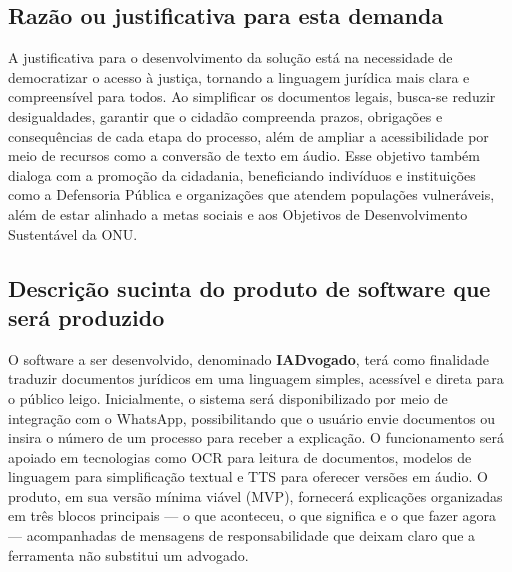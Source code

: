 \documentclass{article}
\begin{document}
    \subsection{Razão ou justificativa para esta demanda}
    A justificativa para o desenvolvimento da solução está na necessidade de democratizar o acesso à justiça, tornando a linguagem jurídica mais clara e compreensível para todos. Ao simplificar os documentos legais, busca-se reduzir desigualdades, garantir que o cidadão compreenda prazos, obrigações e consequências de cada etapa do processo, além de ampliar a acessibilidade por meio de recursos como a conversão de texto em áudio. Esse objetivo também dialoga com a promoção da cidadania, beneficiando indivíduos e instituições como a Defensoria Pública e organizações que atendem populações vulneráveis, além de estar alinhado a metas sociais e aos Objetivos de Desenvolvimento Sustentável da ONU.

\subsection{Descrição sucinta do produto de software que será produzido }
O software a ser desenvolvido, denominado \textbf{IADvogado}, terá como finalidade traduzir documentos jurídicos em uma linguagem simples, acessível e direta para o público leigo. Inicialmente, o sistema será disponibilizado por meio de integração com o WhatsApp, possibilitando que o usuário envie documentos ou insira o número de um processo para receber a explicação. O funcionamento será apoiado em tecnologias como OCR para leitura de documentos, modelos de linguagem para simplificação textual e TTS para oferecer versões em áudio. O produto, em sua versão mínima viável (MVP), fornecerá explicações organizadas em três blocos principais — o que aconteceu, o que significa e o que fazer agora — acompanhadas de mensagens de responsabilidade que deixam claro que a ferramenta não substitui um advogado. 
\end{document}
